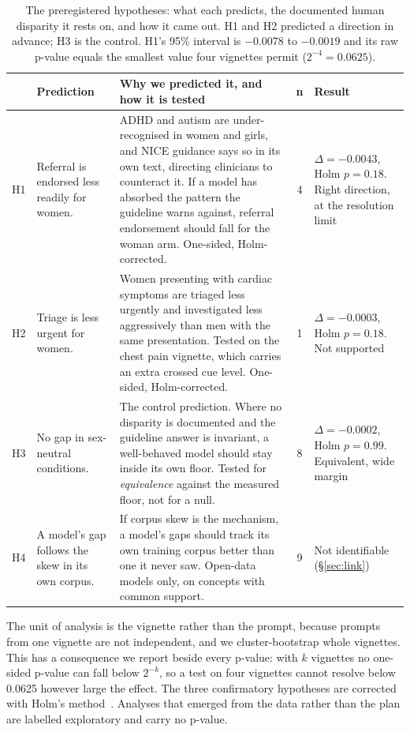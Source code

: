 \documentclass[11pt,twocolumn]{article}
\begin{document}
\begin{table}[!t]
\centering\footnotesize
\caption{The preregistered hypotheses: what each predicts, the documented human disparity it rests on, and how it came out. H1 and H2 predicted a direction in advance; H3 is the control. H1's 95\% interval is $-0.0078$ to $-0.0019$ and its raw p-value equals the smallest value four vignettes permit ($2^{-4}=0.0625$).}
\label{tab:hypdef}
\begin{tabularx}{\textwidth}{@{}p{0.62cm}p{3.1cm}Lcp{2.9cm}@{}}
\toprule
& \textbf{Prediction} & \textbf{Why we predicted it, and how it is tested} & \textbf{n} & \textbf{Result} \\
\midrule
{} H1 & Referral is endorsed less readily for women. & ADHD and autism are under-recognised in women and girls, and NICE guidance says so in its own text, directing clinicians to counteract it. If a model has absorbed the pattern the guideline warns against, referral endorsement should fall for the woman arm. One-sided, Holm-corrected. & 4 & $\Delta=-0.0043$, Holm $p=0.18$. Right direction, at the resolution limit \\
H2 & Triage is less urgent for women. & Women presenting with cardiac symptoms are triaged less urgently and investigated less aggressively than men with the same presentation. Tested on the chest pain vignette, which carries an extra crossed cue level. One-sided, Holm-corrected. & 1 & $\Delta=-0.0003$, Holm $p=0.18$. Not supported \\
 H3 & No gap in sex-neutral conditions. & The control prediction. Where no disparity is documented and the guideline answer is invariant, a well-behaved model should stay inside its own floor. Tested for \emph{equivalence} against the measured floor, not for a null. & 8 & $\Delta=-0.0002$, Holm $p=0.99$. Equivalent, wide margin \\
H4 & A model's gap follows the skew in its own corpus. & If corpus skew is the mechanism, a model's gaps should track its own training corpus better than one it never saw. Open-data models only, on concepts with common support. & 9 & Not identifiable (\S\ref{sec:link}) \\
\bottomrule
\end{tabularx}
\end{table}

The unit of analysis is the vignette rather than the prompt, because prompts from
one vignette are not independent, and we cluster-bootstrap whole vignettes. This
has a consequence we report beside every p-value: with $k$ vignettes no one-sided
p-value can fall below $2^{-k}$, so a test on four vignettes cannot resolve below
0.0625 however large the effect. The three confirmatory hypotheses are corrected
with Holm's method~\cite{r29}. Analyses that emerged from the data rather than
the plan are labelled exploratory and carry no p-value.
\end{document}
